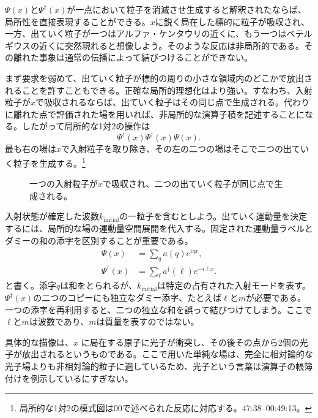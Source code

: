 \(\Psi(x)\)と\(\Psi^\dagger(x)\)が一点において粒子を消滅させ生成すると解釈されたならば、局所性を直接表現することができる。\(x\)に鋭く局在した標的に粒子が吸収され、一方、出ていく粒子が一つはアルファ・ケンタウリの近くに、もう一つはベテルギウスの近くに突然現れると想像しよう。そのような反応は非局所的である。その離れた事象は通常の伝播によって結びつけることができない。

まず要求を弱めて、出ていく粒子が標的の周りの小さな領域内のどこかで放出されることを許すこともできる。正確な局所的理想化はより強い。すなわち、入射粒子が\(x\)で吸収されるならば、出ていく粒子はその同じ点で生成される。代わりに離れた点で評価された場を用いれば、非局所的な演算子積を記述することになる。したがって局所的な1対2の操作は
\begin{equation}
\Psi^\dagger(x)\Psi^\dagger(x)\Psi(x).
\end{equation}
最も右の場は\(x\)で入射粒子を取り除き、その左の二つの場はそこで二つの出ていく粒子を生成する。\footnote{局所的な1対2の模式図は00で述べられた反応に対応する。47:38--00:49:13。}

\begin{figure}[t]
\centering
{}
\caption{一つの入射粒子が\(x\)で吸収され、二つの出ていく粒子が同じ点で生成される。}
\end{figure}

入射状態が確定した波数\(k_{\mathrm{initial}}\)の一粒子を含むとしよう。出ていく運動量を決定するには、局所的な場の運動量空間展開を代入する。固定された運動量ラベルとダミーの和の添字を区別することが重要である。
\begin{align}
\Psi(x)&=\sum_q a(q)e^{iqx},\\
\Psi^\dagger(x)&=\sum_\ell a^\dagger(\ell)e^{-i\ell x}.
\end{align}
と書く。添字\(q\)は和をとられるが、\(k_{\mathrm{initial}}\)は特定の占有された入射モードを表す。\(\Psi^\dagger(x)\)の二つのコピーにも独立なダミー添字、たとえば\(\ell\)と\(m\)が必要である。一つの添字を再利用すると、二つの独立な和を誤って結びつけてしまう。ここで\(\ell\)と\(m\)は波数であり、\(m\)は質量を表すのではない。

具体的な描像は、\(x\) に局在する原子に光子が衝突し、その後その点から2個の光子が放出されるというものである。ここで用いた単純な場は、完全に相対論的な光子場よりも非相対論的粒子に適しているため、光子という言葉は演算子の帳簿付けを例示しているにすぎない。

